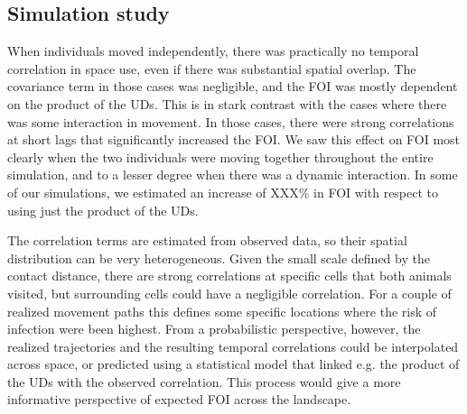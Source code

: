 \documentclass[letterpaper]{article}
\begin{document}
\subsection*{Simulation study}

When individuals moved independently, there was practically no temporal correlation in space use, even if there was substantial spatial overlap. The covariance term in those cases was negligible, and the FOI was mostly dependent on the product of the UDs.
This is in stark contrast with the cases where there was some interaction in movement. 
In those cases, there were strong correlations at short lags that significantly increased the FOI. 
We saw this effect on FOI most clearly when the two individuals were moving together throughout the entire simulation, and to a lesser degree when there was a dynamic interaction.
In some of our simulations, we estimated an increase of XXX\% in FOI with respect to using just the product of the UDs.

The correlation terms are estimated from observed data, so their spatial distribution can be very heterogeneous. Given the small scale defined by the contact distance, there are strong correlations at  specific cells that both animals visited, but surrounding cells could have a negligible correlation. 
For a couple of realized movement paths this defines some specific locations where the risk of infection were been highest. From a probabilistic perspective, however, the realized trajectories and the resulting temporal correlations could be interpolated across space, or predicted using a statistical model that linked e.g. the product of the UDs with the observed correlation. This process would give a more informative perspective of expected FOI across the landscape. 


\end{document}

